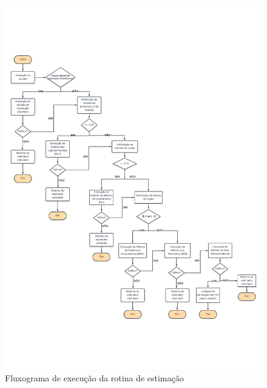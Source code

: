 \documentclass[11pt]{article}
\begin{document}
\begin{figure}[H]
     \centering
     \includegraphics[scale=0.80]{FluxogramaDeExecucao-A4.pdf}
     \caption{Fluxograma de execução da rotina de estimação}
     \label{fig1}
\end{figure}


\newpage

%

%
\end{document}
